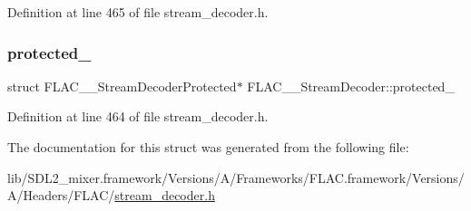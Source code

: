 Definition at line 465 of file stream\+\_\+decoder.\+h.

\mbox{\label{struct_f_l_a_c_____stream_decoder_a17beb7a75f968592700bddec512f204d}} 
\subsubsection{\texorpdfstring{protected\_}{protected\_}}
{\footnotesize\ttfamily struct F\+L\+A\+C\+\_\+\+\_\+\+Stream\+Decoder\+Protected$\ast$ F\+L\+A\+C\+\_\+\+\_\+\+Stream\+Decoder\+::protected\+\_\+}



Definition at line 464 of file stream\+\_\+decoder.\+h.



The documentation for this struct was generated from the following file\+:\begin{DoxyCompactItemize}
\item 
lib/\+S\+D\+L2\+\_\+mixer.\+framework/\+Versions/\+A/\+Frameworks/\+F\+L\+A\+C.\+framework/\+Versions/\+A/\+Headers/\+F\+L\+A\+C/\mbox{\hyperlink{stream__decoder_8h}{stream\+\_\+decoder.\+h}}\end{DoxyCompactItemize}
